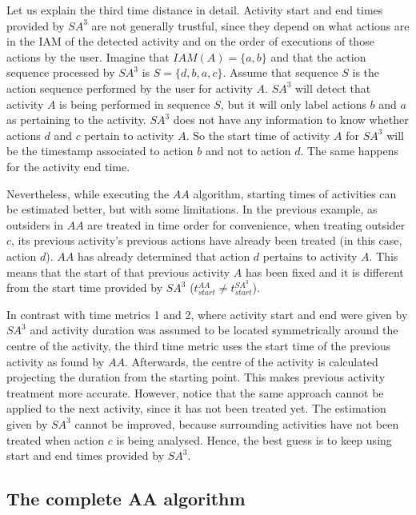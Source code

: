 Let us explain the third time distance in detail. Activity start and end times provided by $SA^3$ are not generally trustful, since they depend on what actions are in the IAM of the detected activity and on the order of executions of those actions by the user. Imagine that $IAM(A)=\{a, b\}$ and that the action sequence processed by $SA^3$ is $S=\{d, b, a, c\}$. Assume that sequence $S$ is the action sequence performed by the user for activity $A$. $SA^3$ will detect that activity $A$ is being performed in sequence $S$, but it will only label actions $b$ and $a$ as pertaining to the activity. $SA^3$ does not have any information to know whether actions $d$ and $c$ pertain to activity $A$. So the start time of activity $A$ for $SA^3$ will be the timestamp associated to action $b$ and not to action $d$. The same happens for the activity end time.

Nevertheless, while executing the $AA$ algorithm, starting times of activities can be estimated better, but with some limitations. In the previous example, as outsiders in $AA$ are treated in time order for convenience, when treating outsider $c$, its previous activity's previous actions have already been treated (in this case, action $d$). $AA$ has already determined that action $d$ pertains to activity $A$. This means that the start of that previous activity $A$ has been fixed and it is different from the start time provided by $SA^3$ ($t_{start} ^{AA} \neq t_{start} ^{SA^3}$).

In contrast with time metrics 1 and 2, where activity start and end were given by $SA^3$ and activity duration was assumed to be located symmetrically around the centre of the activity, the third time metric uses the start time of the previous activity as found by $AA$. Afterwards, the centre of the activity is calculated projecting the duration from the starting point. This makes previous activity treatment more accurate. However, notice that the same approach cannot be applied to the next activity, since it has not been treated yet. The estimation given by $SA^3$ cannot be improved, because surrounding activities have not been treated when action $c$ is being analysed. Hence, the best guess is to keep using start and end times provided by $SA^3$.

\subsection{The complete AA algorithm}
\label{subsec:clustering:complete-ac}

